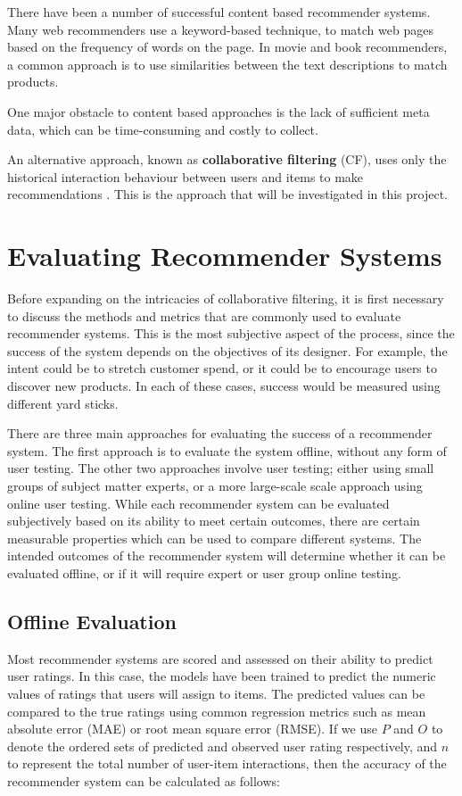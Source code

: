 There have been a number of successful content based recommender systems. Many web recommenders use a keyword-based technique, to match web pages based on the frequency of words on the page. In movie and book recommenders, a common approach is to use similarities between the text descriptions to match products. \parencite{handbook_1.3_content-based}

One major obstacle to content based approaches is the lack of sufficient meta data, which can be time-consuming and costly to collect. \parencite{cf_1.6_implicit}

An alternative approach, known as \textbf{collaborative filtering} (CF), uses only the historical interaction behaviour between users and items to make recommendations \parencite{cf_1.1}. This is the approach that will be investigated in this project.

\section{Evaluating Recommender Systems}
Before expanding on the intricacies of collaborative filtering, it is first necessary to discuss the methods and metrics that are commonly used to evaluate recommender systems. This is the most subjective aspect of the process, since the success of the system depends on the objectives of its designer. For example, the intent could be to stretch customer spend, or it could be to encourage users to discover new products. In each of these cases, success would be measured using different yard sticks. \parencite{eval_colab}

There are three main approaches for evaluating the success of a recommender system. The first approach is to evaluate the system offline, without any form of user testing. The other two approaches involve user testing; either using small groups of subject matter experts, or a more large-scale scale approach using online user testing. While each recommender system can be evaluated subjectively based on its ability to meet certain outcomes, there are certain measurable properties which can be used to compare different systems. \parencite{handbook_1.8_evaluation} The intended outcomes of the recommender system will determine whether it can be evaluated offline, or if it will require expert or user group online testing.

\subsection{Offline Evaluation}
Most recommender systems are scored and assessed on their ability to predict user ratings. In this case, the models have been trained to predict the numeric values of ratings that users will assign to items. The predicted values can be compared to the true ratings using common regression metrics such as mean absolute error (MAE) or root mean square error (RMSE). \parencite{eval_coverage} If we use $P$ and $O$ to denote the ordered sets of predicted and observed user rating respectively, and $n$ to represent the total number of user-item interactions, then the accuracy of the recommender system can be calculated as follows:

